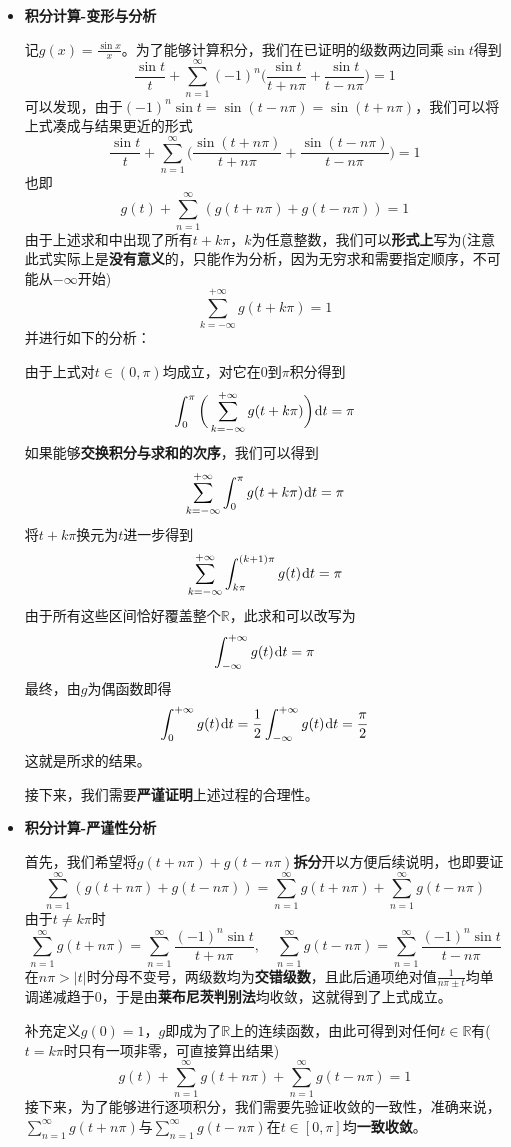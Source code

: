 \documentclass[a4paper,UTF8,fontset=windows,AutoFakeBold]{ctexart}
\newcommand*{\dr}{\hspace{0.07em}\mathrm{d}}
\newcommand*{\rb}{\mathbb{R}}
\newcommand*{\suminf}[1][n=1]{\sum_{#1}^\infty}
\theoremstyle{ex}
\begin{document}
\begin{framed}
{\begin{itemize}
        \item \textbf{积分计算-变形与分析}
        
        记$g(x)=\frac{\sin x}{x}$。为了能够计算积分，我们在已证明的级数两边同乘$\sin t$得到
        $$\frac{\sin t}{t}+\suminf(-1)^n\bigg(\frac{\sin t}{t+n\pi}+\frac{\sin t}{t-n\pi}\bigg)=1$$
        可以发现，由于$(-1)^n\sin t=\sin(t-n\pi)=\sin(t+n\pi)$，我们可以将上式凑成与结果更近的形式
        $$\frac{\sin t}{t}+\suminf\bigg(\frac{\sin(t+n\pi)}{t+n\pi}+\frac{\sin(t-n\pi)}{t-n\pi}\bigg)=1$$
        也即
        $$g(t)+\suminf(g(t+n\pi)+g(t-n\pi))=1$$
        由于上述求和中出现了所有$t+k\pi$，$k$为任意整数，我们可以\textbf{形式上}写为(注意此式实际上是\textbf{没有意义}的，只能作为分析，因为无穷求和需要指定顺序，不可能从$-\infty$开始)
        $$\sum_{k=-\infty}^{+\infty}g(t+k\pi)=1$$
        并进行如下的分析：

        由于上式对$t\in(0,\pi)$均成立，对它在0到$\pi$积分得到
        $$\int_0^\pi\bigg(\sum_{k=-\infty}^{+\infty}g(t+k\pi)\bigg)\dr t=\pi$$
        如果能够\textbf{交换积分与求和的次序}，我们可以得到
        $$\sum_{k=-\infty}^{+\infty}\int_0^\pi g(t+k\pi)\dr t=\pi$$
        将$t+k\pi$换元为$t$进一步得到
        $$\sum_{k=-\infty}^{+\infty}\int_{k\pi}^{(k+1)\pi}g(t)\dr t=\pi$$
        由于所有这些区间恰好覆盖整个$\rb$，此求和可以改写为
        $$\int_{-\infty}^{+\infty}g(t)\dr t=\pi$$
        最终，由$g$为偶函数即得
        $$\int_0^{+\infty}g(t)\dr t=\frac{1}{2}\int_{-\infty}^{+\infty}g(t)\dr t=\frac{\pi}{2}$$
        这就是所求的结果。
    
        接下来，我们需要\textbf{严谨证明}上述过程的合理性。

        \item \textbf{积分计算-严谨性分析}
            
        首先，我们希望将$g(t+n\pi)+g(t-n\pi)$\textbf{拆分}开以方便后续说明，也即要证
        $$\suminf(g(t+n\pi)+g(t-n\pi))=\suminf g(t+n\pi)+\suminf g(t-n\pi)$$
        由于$t\ne k\pi$时
        $$\suminf g(t+n\pi)=\suminf\frac{(-1)^n\sin t}{t+n\pi},\quad\suminf g(t-n\pi)=\suminf\frac{(-1)^n\sin t}{t-n\pi}$$
        在$n\pi>|t|$时分母不变号，两级数均为\textbf{交错级数}，且此后通项绝对值$\frac{1}{n\pi\pm t}$均单调递减趋于0，于是由\textbf{莱布尼茨判别法}均收敛，这就得到了上式成立。

        补充定义$g(0)=1$，$g$即成为了$\rb$上的连续函数，由此可得到对任何$t\in\rb$有($t=k\pi$时只有一项非零，可直接算出结果)
        $$g(t)+\suminf g(t+n\pi)+\suminf g(t-n\pi)=1$$
        接下来，为了能够进行逐项积分，我们需要先验证收敛的一致性，准确来说，$\suminf g(t+n\pi)$与$\suminf g(t-n\pi)$在$t\in[0,\pi]$均\textbf{一致收敛}。


\end{itemize}}
\end{framed}
\end{document}
